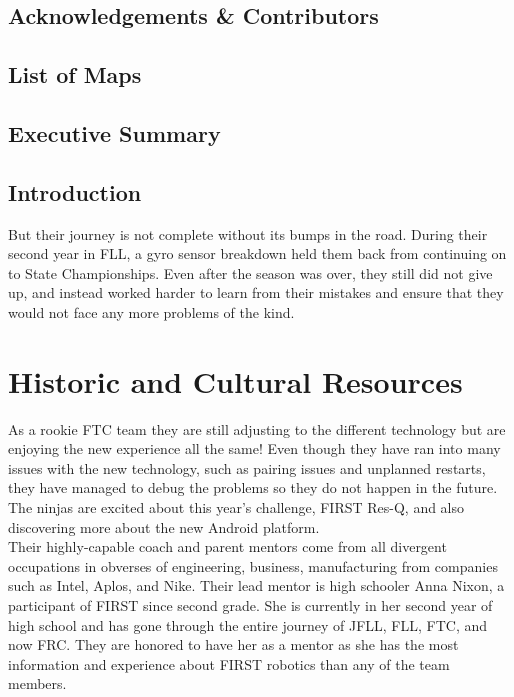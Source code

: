 \documentclass[11pt,fleqn]{book} %
\begin{document}


\chapter{Acknowledgements \& Contributors}


\chapter{List of Maps}


\chapter{Executive Summary}


\chapter{Introduction}

\noindent But their journey is not complete without its bumps in the road. During their second year in FLL, a gyro sensor breakdown held them back from continuing on to State Championships. Even after the season was over, they still did not give up, and instead worked harder to learn from their mistakes and ensure that they would not face any more problems of the kind.\\

\part{Historic and Cultural Resources}

\noindent As a rookie FTC team they are still adjusting to the different technology but are enjoying the new experience all the same! Even though they have ran into many issues with the new technology, such as pairing issues and unplanned restarts, they have managed to debug the problems so they do not happen in the future. The ninjas are excited about this year’s challenge, FIRST Res-Q, and also discovering more about the new Android platform. \\

\noindent Their highly-capable coach and parent mentors come from all divergent occupations in obverses of engineering, business, manufacturing from companies such as Intel, Aplos, and Nike. Their lead mentor is high schooler Anna Nixon, a participant of FIRST since second grade. She is currently in her second year of high school and has gone through the entire journey of JFLL, FLL, FTC, and now FRC. They are honored to have her as a mentor as she has the most information and experience about FIRST robotics than any of the team members.\\
\end{document}
